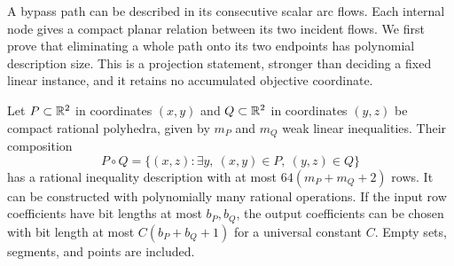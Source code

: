 A bypass path can be described in its consecutive scalar arc flows.
Each internal node gives a compact planar relation between its two
incident flows. We first prove that eliminating a whole path onto its
two endpoints has polynomial description size. This is a projection
statement, stronger than deciding a fixed linear instance, and it
retains no accumulated objective coordinate.

\begin{lemma}\label{s4:polygon-composition}
Let $P\subset\mathbb R^2$ in coordinates $(x,y)$ and $Q\subset\mathbb R^2$ in
coordinates $(y,z)$ be compact rational polyhedra, given by $m_P$ and
$m_Q$ weak linear inequalities. Their composition
\[
 P\circ Q=\{(x,z):\exists y,\ (x,y)\in P,\ (y,z)\in Q\}
\]
has a rational inequality description with at most
$64(m_P+m_Q+2)$ rows. It can be constructed with polynomially many
rational operations. If the input row coefficients have bit lengths
at most $b_P,b_Q$, the output coefficients can be chosen with bit
length at most $C(b_P+b_Q+1)$ for a universal constant $C$.
Empty sets, segments, and points are included.
\end{lemma}
